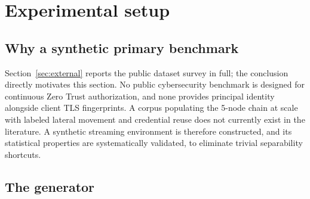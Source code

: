 \section{Experimental setup}
\label{sec:setup}

\subsection{Why a synthetic primary benchmark}

Section~\ref{sec:external} reports the public dataset survey in full; the conclusion
directly motivates this section. No public cybersecurity benchmark is designed for
continuous Zero Trust authorization, and none provides principal identity alongside
client TLS fingerprints. A corpus populating the 5-node chain at scale with labeled
lateral movement and credential reuse does not currently exist in the literature. A synthetic streaming
environment is therefore constructed, and its statistical properties are systematically
validated, to eliminate trivial separability shortcuts.

\subsection{The generator}

